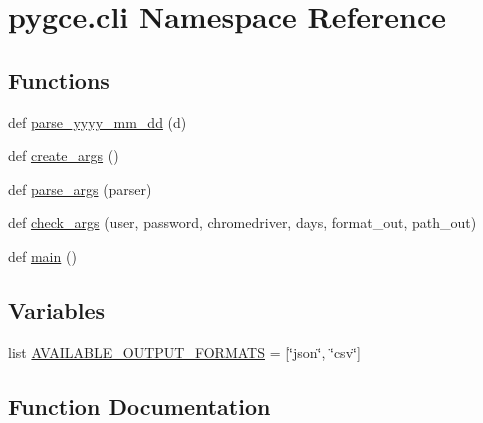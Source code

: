 \hypertarget{namespacepygce_1_1cli}{}\section{pygce.\+cli Namespace Reference}
\label{namespacepygce_1_1cli}
\subsection*{Functions}
\begin{DoxyCompactItemize}
\item 
def \hyperlink{namespacepygce_1_1cli_a807a6becfdbbb6dab4fede7208861afc}{parse\+\_\+yyyy\+\_\+mm\+\_\+dd} (d)
\item 
def \hyperlink{namespacepygce_1_1cli_a5734100556cffce34b4b53f9d027080b}{create\+\_\+args} ()
\item 
def \hyperlink{namespacepygce_1_1cli_a7729e758c25a70a57c0578bd4dde32df}{parse\+\_\+args} (parser)
\item 
def \hyperlink{namespacepygce_1_1cli_a0f7f85c9696c954d49239d75ffe8face}{check\+\_\+args} (user, password, chromedriver, days, format\+\_\+out, path\+\_\+out)
\item 
def \hyperlink{namespacepygce_1_1cli_a696dc9e135d9815a0d4a889eb94c18fb}{main} ()
\end{DoxyCompactItemize}
\subsection*{Variables}
\begin{DoxyCompactItemize}
\item 
list \hyperlink{namespacepygce_1_1cli_a13e8047ab788ce64d94c1077ad4218e5}{A\+V\+A\+I\+L\+A\+B\+L\+E\+\_\+\+O\+U\+T\+P\+U\+T\+\_\+\+F\+O\+R\+M\+A\+TS} = \mbox{[}\char`\"{}json\char`\"{}, \char`\"{}csv\char`\"{}\mbox{]}
\end{DoxyCompactItemize}


\subsection{Function Documentation}
